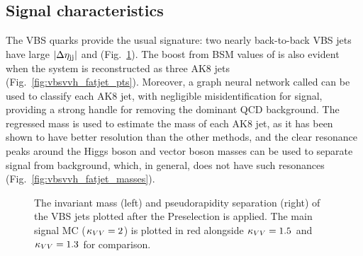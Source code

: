 \subsection{Signal characteristics}
The VBS quarks provide the usual signature: two nearly back-to-back VBS jets have large $|\Delta\eta_{\mathrm{j}\mathrm{j}}|$ and \Mjj (Fig.~\ref{fig:vbsvvh_vbs_vars}). 
The boost from BSM values of \kVV is also evident when the \VVH system is reconstructed as three AK8 jets (Fig.~\ref{fig:vbsvvh_fatjet_pts}). 
Moreover, a graph neural network called \ParticleNet can be used to classify each AK8 jet, with negligible misidentification for signal, providing a strong handle for removing the dominant QCD background.
The \ParticleNet regressed mass \MPNet is used to estimate the mass of each AK8 jet, as it has been shown to have better resolution than the other methods, and the clear resonance peaks around the Higgs boson and vector boson masses can be used to separate signal from background, which, in general, does not have such resonances (Fig.~\ref{fig:vbsvvh_fatjet_masses}). 

\begin{figure}[htb]
    \centering
    \qquad
    \caption[The \Mjj and \detajj distribution for the VBS jets]{
        The invariant mass \Mjj (left) and pseudorapidity separation \detajj (right) of the VBS jets plotted after the Preselection is applied. 
        The main signal MC ($\kappa_{VV} = 2$) is plotted in red alongside $\kappa_{VV} = 1.5$ and $\kappa_{VV} = 1.3$ for comparison. 
    }
    \label{fig:vbsvvh_vbs_vars}
\end{figure}

